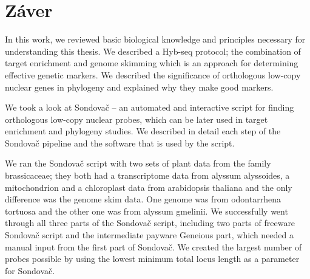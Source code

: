 \chapter*{Záver}  %





In this work, we reviewed basic biological knowledge and principles necessary for understanding this thesis. 
We described a Hyb-seq protocol; the combination of target enrichment and genome skimming which is an approach for determining 
effective genetic markers. We described the significance of orthologous low-copy nuclear genes in phylogeny and explained why they make good 
markers. 

We took a look at Sondovač -- an automated and interactive script for finding orthologous low-copy nuclear probes, which can be later used in 
target enrichment and phylogeny studies. We described in detail each step of the Sondovač pipeline and the software that is used by the script. 

We ran the Sondovač script with two sets of plant data from the family brassicaceae; they both had a transcriptome data from alyssum alyssoides, a mitochondrion and a chloroplast data 
from arabidopsis thaliana and the only difference was the genome skim data. One genome was from odontarrhena tortuosa and the other one was from alyssum gmelinii. 
We successfully went through all three parts of the Sondovač script, including two parts of freeware Sondovač script and the intermediate payware Geneious part, which needed 
a manual input from the first part of Sondovač. We created the largest number of probes possible by using the lowest minimum total locus length as a parameter for Sondovač. 

